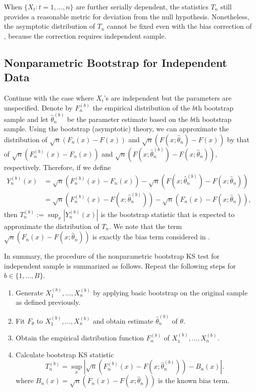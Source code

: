 \documentclass[12pt, titlepage, letterpaper]{article}
\begin{document}
When $\{X_t: t = 1, \ldots, n\}$ are further serially dependent, the statistics
$T_n$ still provides a reasonable metric for deviation from the null
hypothesis. Nonetheless, the asymptotic distribution of $T_n$ cannot be fixed
even with the bias correction of \citet{babu2004goodness}, because the
correction requires independent sample.

\subsection{Nonparametric Bootstrap for Independent Data}

Continue with the case where $X_i$'s are independent but the parameters
are unspecified. Denote by
$F^{(b)}_n$ the empirical distribution of the $b$th bootstrap sample and let
$\hat\theta^{(b)}_n$ be the parameter estimate based on the $b$th bootstrap 
sample. 
Using the bootstrap (asymptotic) theory, we can approximate the distribution of
$\sqrt{n}(F_n(x) - F(x))$ and $\sqrt{n}(F(x; \hat\theta_n) - F(x))$
by that of $\sqrt{n}(F^{(b)}_n(x) - F_n(x))$ and
$\sqrt{n}(F(x; \hat\theta^{(b)}_n) - F(x; \hat\theta_n))$, respectively.
Therefore, if we define
\begin{align*}
Y^{(b)}_n(x) &= \sqrt{n}(F^{(b)}_n(x) - F_n(x)) - 
               \sqrt{n}(F(x; \hat\theta^{(b)}_n) - F(x; \hat\theta_n)) \\
             &= \sqrt{n}(F^{(b)}_n(x) - F(x; \hat\theta^{(b)}_n)) - 
               \sqrt{n}(F_n(x) - F(x; \hat\theta_n)),
\end{align*}
then $T^{(b)}_n := \sup_x|Y^{(b)}_n(x)|$ is the bootstrap statistic that is 
expected to approximate the distribution of $T_n$. We note that the term
$\sqrt{n}(F_n(x) - F(x; \hat\theta_n))$ is exactly the bias term considered in 
\citet{babu2004goodness}.


In summary, the procedure of the nonparametric bootstrap KS test for independent
sample is 
summarized as follows. Repeat the following steps for $b \in \{1, ..., B\}$.
\begin{enumerate}
\item
  Generate $X^{(b)}_1,...,X^{(b)}_n$ by applying basic bootstrap 
  on the original sample as
  defined previously.
\item
  Fit $F_\theta$ to $X^{(b)}_1,...,X^{(b)}_n$ and obtain estimate 
	$\hat\theta^{(b)}_n$ of $\theta$.
\item
  Obtain the empirical distribution function $F^{(b)}_n$ of
  $X^{(b)}_1,...,X^{(b)}_n$. 
\item
  Calculate bootstrap KS statistic
  \[
    T^{(b)}_n = \sup_x | \sqrt{n}\left(F^{(b)}_n(x) 
    - F(x; \hat\theta^{(b)}_n)\right) - B_n(x) |.
  \]
  where 
  $B_{n}(x) = \sqrt{n}(F_n(x) - F(x; \hat\theta_n))$ is the known
  bias term.
\end{enumerate}
\end{document}
